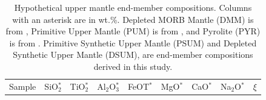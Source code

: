 \documentclass[draft,linenumbers]{agujournal2018}
\begin{document}
\begin{longtable}[]{@{}
  >{\raggedright\arraybackslash}p{}
  >{\raggedleft\arraybackslash}p{}
  >{\raggedleft\arraybackslash}p{}
  >{\raggedleft\arraybackslash}p{}
  >{\raggedleft\arraybackslash}p{}
  >{\raggedleft\arraybackslash}p{}
  >{\raggedleft\arraybackslash}p{}
  >{\raggedleft\arraybackslash}p{}
  >{\raggedleft\arraybackslash}p{}@{}}
\caption{\label{tab:benchmark-samples} Hypothetical upper mantle end-member compositions. Columns with an asterisk are in wt.\%. Depleted MORB Mantle (DMM) is from \citet{workman2005}, Primitive Upper Mantle (PUM) is from \citet{sun1989}, and Pyrolite (PYR) is from \citet{green1979}. Primitive Synthetic Upper Mantle (PSUM) and Depleted Synthetic Upper Mantle (DSUM), are end-member compositions derived in this study.}\tabularnewline
\toprule\noalign{}
\begin{minipage}[b]{\linewidth}\raggedright
Sample
\end{minipage} & \begin{minipage}[b]{\linewidth}\raggedleft
SiO\(_2^{*}\)
\end{minipage} & \begin{minipage}[b]{\linewidth}\raggedleft
TiO\(_2^{*}\)
\end{minipage} & \begin{minipage}[b]{\linewidth}\raggedleft
Al\(_2\)O\(_3^{*}\)
\end{minipage} & \begin{minipage}[b]{\linewidth}\raggedleft
FeOT\(^{*}\)
\end{minipage} & \begin{minipage}[b]{\linewidth}\raggedleft
MgO\(^{*}\)
\end{minipage} & \begin{minipage}[b]{\linewidth}\raggedleft
CaO\(^{*}\)
\end{minipage} & \begin{minipage}[b]{\linewidth}\raggedleft
Na\(_2\)O\(^{*}\)
\end{minipage} & \begin{minipage}[b]{\linewidth}\raggedleft
\(\xi\)
\end{minipage} \\

\end{longtable}
\end{document}
